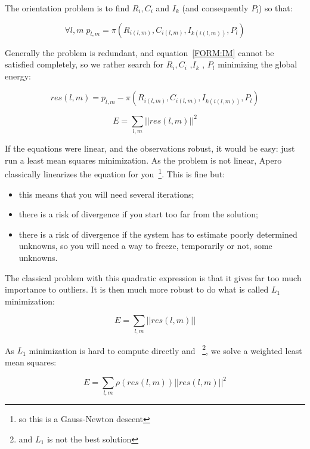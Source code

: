 The orientation problem is to find $R_i,C_i$ and $I_k$ (and consequently $P_l$)
so that:

\begin{equation}
     \forall l,m \;   p_{l,m} =  \pi(R_{i(l,m)},C_{i(l,m)},I_{k(i(l,m))},P_l) \label{FORM:IM}
\end{equation}

Generally the problem is redundant, and  equation~\ref{FORM:IM} cannot
be satisfied completely, so we rather search for  $R_i,C_i$ ,$I_k$ , $P_l$
minimizing the global energy:

\begin{equation}
        res(l,m) =  p_{l,m} -  \pi(R_{i(l,m)},C_{i(l,m)},I_{k(i(l,m))},P_l) \label{FORM:EL2}
\end{equation}

\begin{equation}
      E = \sum_{l,m}  || res(l,m)||^2 \label{FORM:EL2b}
\end{equation}

If the equations were linear, and the observations robust, it would be easy:
just run a least mean squares minimization. As the problem is not linear,
Apero classically linearizes the equation for you~\footnote{so this is a Gauss-Newton descent}.
 This is fine but:

\begin{itemize}
   \item  this means  that you will need several iterations;
   \item  there is a risk of divergence if you start too far from the solution;
   \item  there is a risk of divergence if the system has to estimate poorly determined unknowns,
          so you will need a way to freeze, temporarily or not, some unknowns.
\end{itemize}

The classical problem with this quadratic expression is that it gives far too much
importance to outliers. It is then much more robust to do what is called
$L_1$ minimization:

\begin{equation}
      E = \sum_{l,m}  || res(l,m) || \label{FORM:EL1}
\end{equation}

As $L_1$ minimization is hard to compute directly and ~\footnote{and $L_1$
is not the best solution}, we solve a weighted least mean squares:

\begin{equation}
      E = \sum_{l,m}  \rho(res(l,m)) || res(l,m) ||^2  \label{FORM:ELP}
\end{equation}

